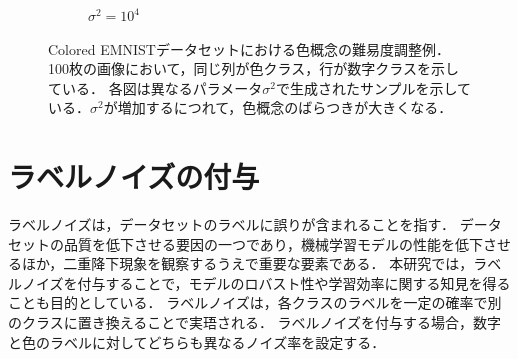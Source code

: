 \begin{figure}[H]
\begin{subfigure}[b]{0.48\textwidth}
        \caption{$\sigma^2 = 10^4$}
        \label{fig:coloredeminst_10000}
    \end{subfigure}
    \caption[Colored EMNISTデータセットにおける色概念の難易度調整例]{Colored EMNISTデータセットにおける色概念の難易度調整例．
    100枚の画像において，同じ列が色クラス，行が数字クラスを示している．
    各図は異なるパラメータ$\sigma^2$で生成されたサンプルを示している．$\sigma^2$が増加するにつれて，色概念のばらつきが大きくなる．
    }
    \label{fig:coloredeminsts}
\end{figure}

\section{ラベルノイズの付与}
ラベルノイズは，データセットのラベルに誤りが含まれることを指す．
データセットの品質を低下させる要因の一つであり，機械学習モデルの性能を低下させるほか，二重降下現象を観察するうえで重要な要素である．
本研究では，ラベルノイズを付与することで，モデルのロバスト性や学習効率に関する知見を得ることも目的としている．
ラベルノイズは，各クラスのラベルを一定の確率で別のクラスに置き換えることで実珸される．
ラベルノイズを付与する場合，数字と色のラベルに対してどちらも異なるノイズ率を設定する．
